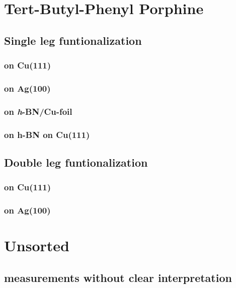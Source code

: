 \documentclass[10pt,a4paper,twoside
,BCOR=8mm				%
,headings=normal		%
,headsepline			%
,footsepline			%
,plainfootsepline		%
]{scrbook}
\begin{document}
\chapter{Tert-Butyl-Phenyl Porphine}
  \section{Single leg funtionalization}
    
   \subsection{on Cu(111)}
      
   \subsection{on Ag(100)}
      
   \subsection{on \textit{h}-BN/Cu-foil}
      
   \subsection{on h-BN on Cu(111)}
      
  \section{Double leg funtionalization}
   \subsection{on Cu(111)}
      
   \subsection{on Ag(100)}
      
\chapter{Unsorted}
   \section{measurements without clear interpretation}
      
	\printindex
\backmatter{}
	\printbibliography  
    
\end{document}
